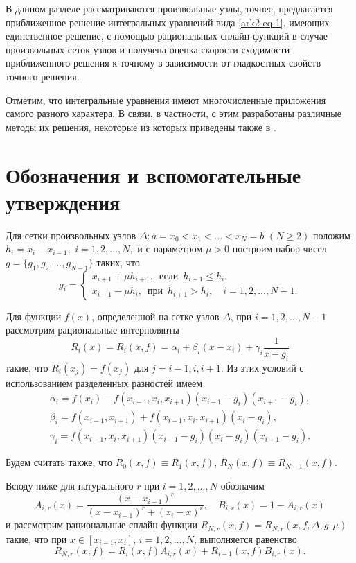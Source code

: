В данном разделе рассматриваются произвольные узлы, точнее, предлагается приближенное
решение интегральных уравнений вида \eqref{ark2-eq-1}, имеющих единственное решение, с помощью
 рациональных сплайн-функций в случае произвольных сеток узлов и получена оценка
 скорости сходимости приближенного решения к точному в зависимости от гладкостных
 свойств точного решения.

Отметим, что интегральные уравнения имеют многочисленные приложения самого разного
характера. В связи, в частности, с этим разработаны различные методы их решения, некоторые
из которых приведены также в \cite{ark-1,ark-2,ark-3}.


\section{Обозначения и вспомогательные утверждения}

Для сетки произвольных узлов $\Delta: a=x_0<x_1<\dots<x_N=b$ $(N\geqslant 2)$ положим
$h_i=x_i-x_{i-1},$ $i=1,2,\dots,N,$ и с параметром  $\mu>0$ построим набор чисел
$g=\{g_1,g_2, \dots,g_{N-1}\}$ таких, что
\begin{equation}\label{ark2-eq-2}
g_i=\begin{cases}
x_{i+1}+\mu h_{i+1}, \,\text{ если }\, h_{i+1}\leqslant h_i,\\
x_{i-1}-\mu h_i, \,\text{ при }\, h_{i+1}> h_i, \quad i=1,2,\dots,N-1.
\end{cases}
\end{equation}

Для функции $f(x)$, определенной на сетке узлов $\Delta$,
при $i=1,2,\dots,N-1$
рассмотрим рациональные интерполянты
\begin{equation}\label{ark2-eq-3}
R_i(x)=R_i(x,f)=\alpha_i+\beta_i(x-x_i)+\gamma_i\frac 1{x-g_i}
\end{equation}
такие, что $R_i(x_j)=f(x_j)$ для $j=i-1,i,i+1$. Из этих условий с использованием
 разделенных разностей имеем
$$
\begin{array}{lcl}
\alpha_i=f(x_i)-f(x_{i-1}, x_i, x_{i+1})(x_{i-1}-g_i)(x_{i+1}-g_i),\\
\beta_i=f(x_{i-1}, x_{i+1})+f(x_{i-1}, x_i, x_{i+1})(x_i-g_i),\\
\gamma_i=f(x_{i-1}, x_i, x_{i+1})(x_{i-1}-g_i)(x_i-g_i)(x_{i+1}-g_i).
\end{array}
$$

Будем считать также, что $R_0(x,f)\equiv R_1(x,f)$, $R_N(x,f)\equiv R_{N-1}(x,f)$.

Всюду ниже для натурального $r$ при $i=1,2,\dots,N$ обозначим
$$
A_{i,r}(x)=\frac{(x-x_{i-1})^r}{(x-x_{i-1})^r+(x_i-x)^r},\quad B_{i,r}(x)=1-A_{i,r}(x)
$$
 и рассмотрим рациональные  сплайн-функции
$R_{N,r}(x,f)=R_{N,r}(x,f,\Delta,g,\mu)$ такие, что при $x\in [x_{i-1}, x_i]$,
 $i=1,2,\dots,N$, выполняется равенство
\begin{equation}\label{ark2-eq-4}
R_{N,r}(x,f)=R_i(x,f)A_{i,r}(x)+R_{i-1}(x,f)B_{i,r}(x).
\end{equation}

